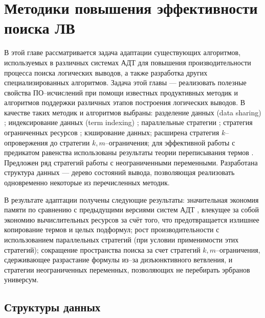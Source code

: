 \chapter{Методики повышения эффективности поиска ЛВ}

В этой главе рассматривается задача адаптации существующих алгоритмов, используемых в различных системах АДТ для повышения производительности процесса поиска логических выводов, а также разработка других специализированных алгоритмов. Задача этой главы --- реализовать полезные свойства ПО--исчислений при помощи известных продуктивных методик и алгоритмов поддержки различных этапов построения логических выводов. В качестве таких методик и алгоритмов выбраны: разделение данных (data sharing) \cite{Che2, Ryazanov2003}; индексирование данных (term indexing) \cite{HARIndex, TermIndexingBook,pathindex}; параллельные стратегии \cite{PSETHEO}; стратегия ограниченных ресурсов \cite{Ryazanov2003}; кэширование данных; расширена стратегия $k$--опровержения \cite{ICDS2000, dissChe} до стратегии $k,m$--ограничения; для эффективной работы с предикатом равенства использованы результаты теории переписывания термов \cite{Nipkow}. Предложен ряд стратегий работы с неограниченными переменными. Разработана структура данных --- дерево состояний вывода, позволяющая реализовать одновременно некоторые из перечисленных методик.

В результате адаптации получены следующие результаты: значительная экономия памяти по сравнению с предыдущими версиями систем АДТ \cite{dissChe}, влекущее за собой экономию вычислительных ресурсов за счёт того, что предотвращается излишнее копирование термов и целых подформул; рост производительности с использованием параллельных стратегий (при условии применимости этих стратегий); сокращение пространства поиска за счет стратегий $k,m$--ограничения, сдерживающее разрастание формулы из--за дизъюнктивного ветвления, и стратегии неограниченных переменных, позволяющих не перебирать эрбранов универсум.



\section{Структуры данных}


